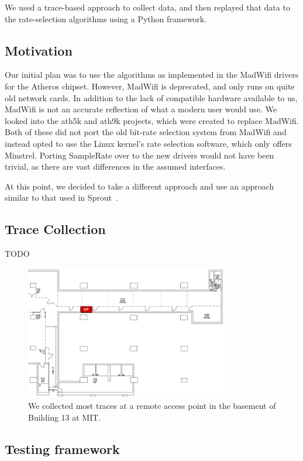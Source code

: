 \documentclass[letterpaper,twocolumn,10pt]{article}
\begin{document}
We used a trace-based approach to collect data, and then replayed that data to the rate-selection algorithms using a Python framework.

\subsection{Motivation}

Our initial plan was to use the algorithms as implemented in the MadWifi drivers for the Atheros chipset. However, MadWifi is deprecated, and only runs on quite old network cards. In addition to the lack of compatible hardware available to us, MadWifi is not an accurate reflection of what a modern user would use. We looked into the ath5k and ath9k projects, which were created to replace MadWifi. Both of these did not port the old bit-rate selection system from MadWifi and instead opted to use the Linux kernel's rate selection software, which only offers Minstrel. Porting SampleRate over to the new drivers would not have been trivial, as there are vast differences in the assumed interfaces. 

At this point, we decided to take a different approach and use an approach similar to that used in Sprout~\cite{sprout}.


\subsection{Trace Collection}

TODO

\begin{figure}[hbt]
  \hspace{-0.5em}\includegraphics[width=3.5in]{bsmt13floorplan.png}\vspace{-0em}
  \caption{We collected most traces at a remote access point in the basement of Building 13 at MIT.}
\label{figure:1}
\end{figure}

\subsection{Testing framework}
\end{document}
